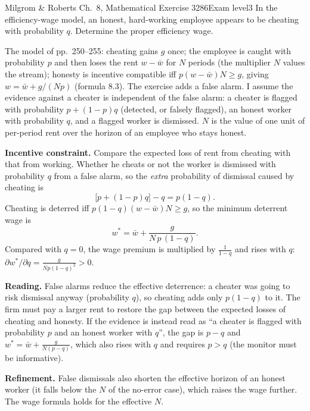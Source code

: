 \begin{exsol}{Milgrom \& Roberts Ch.~8, Mathematical Exercise 3}{286}{Exam level}{3}
\asked In the efficiency-wage model, an honest, hard-working employee appears to be cheating with
probability $q$. Determine the proper efficiency wage.

\method The model of pp.~250--255: cheating gains $g$ once; the employee is caught with probability $p$ and then
loses the rent $w - \bar w$ for $N$ periods (the multiplier $N$ values the stream); honesty is incentive compatible
iff $p(w - \bar w)N \ge g$, giving $w = \bar w + g/(Np)$ (formula 8.3). The exercise adds a false alarm. I assume
the evidence against a cheater is independent of the false alarm: a cheater is flagged with probability
$p + (1-p)q$ (detected, or falsely flagged), an honest worker with probability $q$, and a flagged worker
is dismissed. $N$ is the value of one unit of per-period rent over the horizon of an employee who stays honest.

\solution
\textbf{Incentive constraint.} Compare the expected loss of rent from cheating with that from working. Whether he
cheats or not the worker is dismissed with probability $q$ from a false alarm, so the \emph{extra} probability of
dismissal caused by cheating is
\[
  \bigl[p + (1-p)q\bigr] - q = p(1 - q) .
\]
Cheating is deterred iff $p(1-q)(w - \bar w)N \ge g$, so the minimum deterrent wage is
\[
  w^* = \bar w + \frac{g}{N\,p\,(1-q)} .
\]
Compared with $q = 0$, the wage premium is multiplied by $\frac{1}{1-q}$ and rises with $q$:
$\partial w^*/\partial q = \frac{g}{Np(1-q)^2} > 0$.

\textbf{Reading.} False alarms reduce the effective deterrence: a cheater was going to risk dismissal
anyway (probability $q$), so cheating adds only $p(1-q)$ to it. The firm must pay a larger rent to restore the
gap between the expected losses of cheating and honesty. If the evidence is instead read as ``a cheater is flagged
with probability $p$ and an honest worker with $q$'', the gap is $p - q$ and $w^* = \bar w + \frac{g}{N(p - q)}$,
which also rises with $q$ and requires $p > q$ (the monitor must be informative).

\textbf{Refinement.} False dismissals also shorten the effective horizon of an honest worker (it falls below
the $N$ of the no-error case), which raises the wage further. The wage formula holds for the effective $N$.


\end{exsol}
